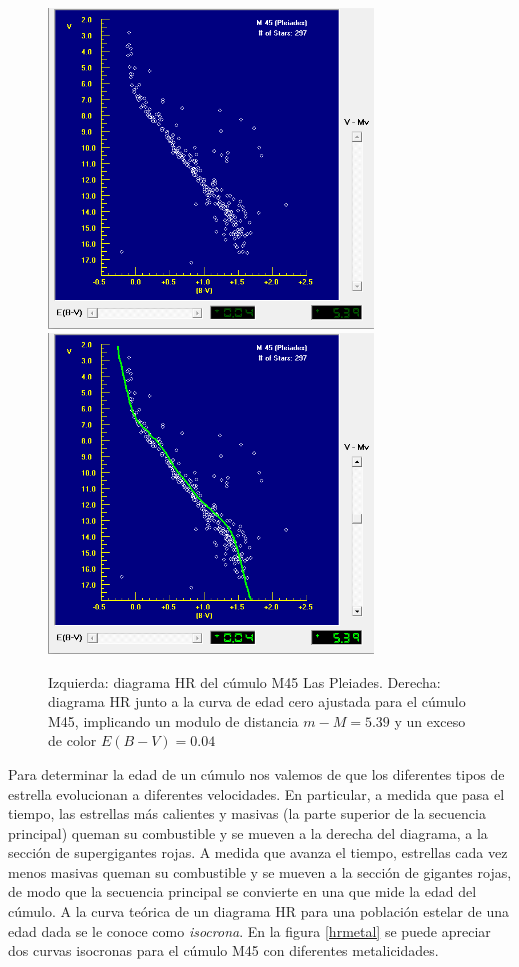 \documentclass[12pt]{article}
\begin{document}
\begin{figure}[H]
    \includegraphics[width= 3.40in]{plea0.png}
    \includegraphics[width= 3.40in]{plea1.png}
  \caption{Izquierda: diagrama HR del cúmulo M45 Las Pleiades. Derecha: diagrama HR junto a la curva de edad cero ajustada para el cúmulo M45, implicando un modulo de distancia $m - M = 5.39$ y un exceso de color $E(B-V) = 0.04$}
  \label{vireaohr}
\end{figure}


Para determinar la edad de un cúmulo nos valemos de que los diferentes tipos de estrella evolucionan a diferentes velocidades. En particular, a medida que pasa el tiempo, las estrellas más calientes y masivas (la parte superior de la secuencia principal) queman su combustible y se mueven a la derecha del diagrama, a la sección de supergigantes rojas.
A medida que avanza el tiempo, estrellas cada vez menos masivas queman su combustible y se mueven a la sección de gigantes rojas, de modo que la secuencia principal se convierte en una  que mide la edad del cúmulo.
A la curva teórica de un diagrama HR para una población estelar de una edad dada se le conoce como \emph{isocrona}. En la figura \ref{hrmetal} se puede apreciar dos curvas isocronas para el cúmulo M45 con diferentes metalicidades.
\end{document}
